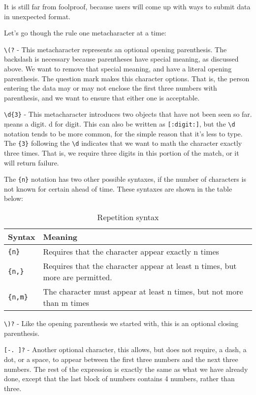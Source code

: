 It is still far from foolproof, because users will come up with ways to submit data in 
unexpected format.

Let's go though the rule one metacharacter at a time:

\verb=\(?= - This metacharacter represents an optional opening parenthesis. The backslash is 
necessary because parentheses have special meaning, as discussed above. We want to remove 
that special meaning, and have a literal opening parenthesis. The question mark makes this 
character options. That is, the person entering the data may or may not enclose the first three 
numbers with parenthesis, and we want to ensure that either one is acceptable.

\verb=\d{3}= - This metacharacter introduces two objects that have not been seen so far. \d means 
a digit. d for digit. This can also be written as \verb=[:digit:]=, but the \verb=\d= notation tends to be more 
common, for the simple reason that it's less to type. The \verb={3}= following the \verb=\d= indicates that 
we want to math the character exactly three times. That is, we require three digits in this 
portion of the match, or it will return failure.

The \verb={n}= notation has two other possible syntaxes, if the number of characters is not 
known for certain ahead of time. These syntaxes are shown in the table below:

\begin{table}[ht]
\caption{Repetition syntax}
\begin{tabular}{l | p{12cm}}
Syntax &
Meaning\\ \hline \hline
\verb={n}= &
Requires that the character appear exactly n times \\ \hline
\verb={n,}= &
Requires that the character appear at least n times, but more are permitted. \\ \hline
\verb={n,m}= &
The character must appear at least n times, but not more than m times\\
\hline
\end{tabular}
\end{table}

\verb=\)?= - Like the opening parenthesis we started with, this is an optional closing parenthesis.

\verb=[-. ]?= - Another optional character, this allows, but does not require, a dash, a dot, or a 
space, to appear between the first three numbers and the next three numbers.
The rest of the expression is exactly the same as what we have already done, except that 
the last block of numbers contains 4 numbers, rather than three.

